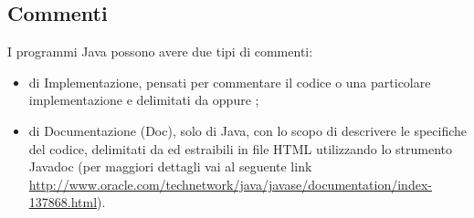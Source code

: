 \subsection{Commenti}
I programmi Java possono avere due tipi di commenti: 
\begin{itemize}
  \item di Implementazione, pensati per commentare il codice o
  una particolare implementazione e delimitati da \co{/*  */} oppure
  \co{//};
  \item di Documentazione (Doc), solo di Java, con lo scopo di descrivere le
  specifiche del codice, delimitati da \co{/**  */} ed estraibili in file HTML
  utilizzando lo strumento Javadoc (per maggiori dettagli vai al seguente link
  \url{http://www.oracle.com/technetwork/java/javase/documentation/index-137868.html}).
\end{itemize}

